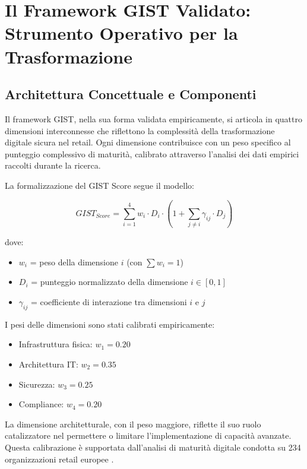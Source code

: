 \section{Il Framework GIST Validato: Strumento Operativo per la Trasformazione}

\subsection{Architettura Concettuale e Componenti}

Il framework GIST, nella sua forma validata empiricamente, si articola in quattro dimensioni interconnesse che riflettono la complessità della trasformazione digitale sicura nel retail. Ogni dimensione contribuisce con un peso specifico al punteggio complessivo di maturità, calibrato attraverso l'analisi dei dati empirici raccolti durante la ricerca.

La formalizzazione del GIST Score segue il modello:

\begin{equation}
GIST_{Score} = \sum_{i=1}^{4} w_i \cdot D_i \cdot (1 + \sum_{j \neq i} \gamma_{ij} \cdot D_j)
\label{eq:gist_score}
\end{equation}

dove:
\begin{itemize}
    \item $w_i$ = peso della dimensione $i$ (con $\sum w_i = 1$)
    \item $D_i$ = punteggio normalizzato della dimensione $i \in [0, 1]$
    \item $\gamma_{ij}$ = coefficiente di interazione tra dimensioni $i$ e $j$
\end{itemize}

I pesi delle dimensioni sono stati calibrati empiricamente:
\begin{itemize}
    \item Infrastruttura fisica: $w_1 = 0.20$
    \item Architettura IT: $w_2 = 0.35$
    \item Sicurezza: $w_3 = 0.25$
    \item Compliance: $w_4 = 0.20$
\end{itemize}

La dimensione architetturale, con il peso maggiore, riflette il suo ruolo catalizzatore nel permettere o limitare l'implementazione di capacità avanzate. Questa calibrazione è supportata dall'analisi di maturità digitale condotta su 234 organizzazioni retail europee \autocite{forrester2024maturity}.

